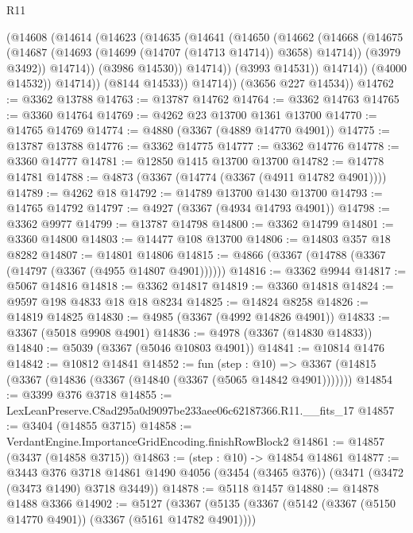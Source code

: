 \begin{lexlean}{R11}
\begin{coremodule}
                  (@14608
                    (@14614
                      (@14623
                        (@14635
                          (@14641
                            (@14650
                              (@14662
                                (@14668
                                  (@14675
                                    (@14687 (@14693 (@14699 (@14707 (@14713 @14714)) @3658) @14714))
                                    (@3979 @3492))
                                  @14714))
                              (@3986 @14530))
                            @14714))
                        (@3993 @14531))
                      @14714))
                  (@4000 @14532))
                @14714))
            (@8144 @14533))
          @14714))
      (@3656 @227 @14534))
@14762 := @3362 @13788
@14763 := @13787 @14762
@14764 := @3362 @14763
@14765 := @3360 @14764
@14769 := @4262 @23 @13700 @1361 @13700
@14770 := @14765 @14769
@14774 := @4880 (@3367 (@4889 @14770 @4901))
@14775 := @13787 @13788
@14776 := @3362 @14775
@14777 := @3362 @14776
@14778 := @3360 @14777
@14781 := @12850 @1415 @13700 @13700
@14782 := @14778 @14781
@14788 := @4873 (@3367 (@14774 (@3367 (@4911 @14782 @4901))))
@14789 := @4262 @18
@14792 := @14789 @13700 @1430 @13700
@14793 := @14765 @14792
@14797 := @4927 (@3367 (@4934 @14793 @4901))
@14798 := @3362 @9977
@14799 := @13787 @14798
@14800 := @3362 @14799
@14801 := @3360 @14800
@14803 := @14477 @108 @13700
@14806 := @14803 @357 @18 @8282
@14807 := @14801 @14806
@14815 := @4866 (@3367 (@14788 (@3367 (@14797 (@3367 (@4955 @14807 @4901))))))
@14816 := @3362 @9944
@14817 := @5067 @14816
@14818 := @3362 @14817
@14819 := @3360 @14818
@14824 := @9597 @198 @4833 @18 @18 @8234
@14825 := @14824 @8258
@14826 := @14819 @14825
@14830 := @4985 (@3367 (@4992 @14826 @4901))
@14833 := @3367 (@5018 @9908 @4901)
@14836 := @4978 (@3367 (@14830 @14833))
@14840 := @5039 (@3367 (@5046 @10803 @4901))
@14841 := @10814 @1476
@14842 := @10812 @14841
@14852 := fun (step : @10) =>
  @3367 (@14815 (@3367 (@14836 (@3367 (@14840 (@3367 (@5065 @14842 @4901)))))))
@14854 := @3399 @376 @3718
@14855 := LexLeanPreserve.C8ad295a0d9097be233aee06c62187366.R11.__fits_17
@14857 := @3404 (@14855 @3715)
@14858 := VerdantEngine.ImportanceGridEncoding.finishRowBlock2
@14861 := @14857 (@3437 (@14858 @3715))
@14863 := (step : @10) -> @14854 @14861
@14877 := @3443
    @376
    @3718
    @14861
    @1490
    @4056
    (@3454 (@3465 @376))
    (@3471 (@3472 (@3473 @1490) @3718 @3449))
@14878 := @5118 @1457
@14880 := @14878 @1488 @3366
@14902 := @5127
    (@3367
      (@5135
        (@3367 (@5142 (@3367 (@5150 @14770 @4901)) (@3367 (@5161 @14782 @4901))))

\end{coremodule}
\end{lexlean}
